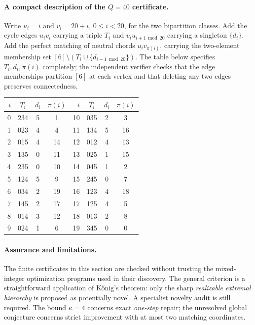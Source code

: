 \documentclass[11pt]{article}
\begin{document}
\paragraph{A compact description of the $Q=40$ certificate.}
Write $u_i=i$ and $v_i=20+i$, $0\le i<20$, for the two
bipartition classes. Add the cycle edges $u_iv_i$ carrying
a triple $T_i$ and $v_iu_{i+1\bmod20}$ carrying a singleton
$\{d_i\}$. Add the perfect matching of neutral chords
$u_iv_{\pi(i)}$, carrying the two-element membership set
$[6]\setminus(T_i\cup\{d_{i-1\bmod20}\})$.
The table below specifies $T_i,d_i,\pi(i)$ completely; the
independent verifier checks that the edge memberships partition
$[6]$ at each vertex and that deleting any two edges preserves
connectedness.
\begin{center}\small
\begin{tabular}{rccc|rccc}\toprule
$i$&$T_i$&$d_i$&$\pi(i)$&$i$&$T_i$&$d_i$&$\pi(i)$\\\midrule
0&234&5&1&10&035&2&3\\
1&023&4&4&11&134&5&16\\
2&015&4&14&12&012&4&13\\
3&135&0&11&13&025&1&15\\
4&235&0&10&14&045&1&2\\
5&124&5&9&15&245&0&7\\
6&034&2&19&16&123&4&18\\
7&145&2&17&17&125&4&5\\
8&014&3&12&18&013&2&8\\
9&024&1&6&19&345&0&0\\
\bottomrule\end{tabular}
\end{center}

\paragraph{Assurance and limitations.}
The finite certificates in this section are checked without
trusting the mixed-integer optimization programs used in their
discovery. The general criterion is a straightforward application
of K\H onig's theorem: only the sharp \emph{realizable extremal
hierarchy} is proposed as potentially novel. A specialist novelty
audit is still required. The bound $\kappa=4$ concerns exact
\emph{one-step} repair; the unresolved global conjecture concerns
strict improvement with at most two matching coordinates.
\end{document}
